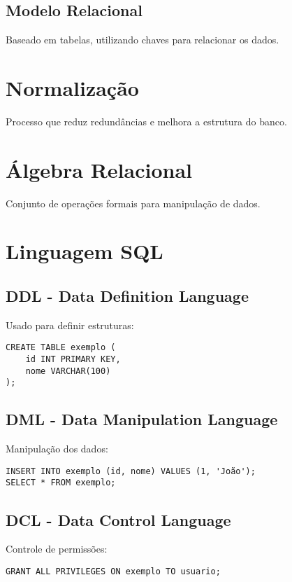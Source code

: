 \documentclass{article}
\begin{document}
\subsection{Modelo Relacional}
Baseado em tabelas, utilizando chaves para relacionar os dados.

\section{Normalização}
Processo que reduz redundâncias e melhora a estrutura do banco.

\section{Álgebra Relacional}
Conjunto de operações formais para manipulação de dados.

\section{Linguagem SQL}
\subsection{DDL - Data Definition Language}
Usado para definir estruturas:
\begin{verbatim}
CREATE TABLE exemplo (
    id INT PRIMARY KEY,
    nome VARCHAR(100)
);
\end{verbatim}

\subsection{DML - Data Manipulation Language}
Manipulação dos dados:
\begin{verbatim}
INSERT INTO exemplo (id, nome) VALUES (1, 'João');
SELECT * FROM exemplo;
\end{verbatim}

\subsection{DCL - Data Control Language}
Controle de permissões:
\begin{verbatim}
GRANT ALL PRIVILEGES ON exemplo TO usuario;
\end{verbatim}
\end{document}
